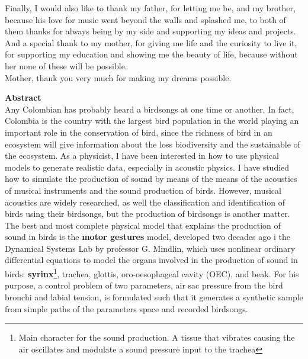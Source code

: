Finally, I would also like to thank my father, for letting me be, and my brother, because his love for music went beyond the walls and splashed me, to both of them thanks for always being by my side and supporting my ideas and projects. And a special thank to my mother, for giving me life and the curiosity to live it, for supporting my education and showing me the beauty of life, because without her none of these will be possible.\\

Mother, thank you very much for making my dreams possible.

\newpage{\pagestyle{empty}\cleardoublepage}

\newpage


\textbf{\LARGE Abstract}\\

Any Colombian has probably heard a birdsongs at one time or another. In fact, Colombia is the country with the largest bird population in the world playing an important role in the conservation of bird, since the  richness of bird in an ecosystem will give information about the loss biodiversity and the sustainable of the ecosystem. As a physicist, I have been interested in how to use physical models to generate realistic data, especially in acoustic physics. I have studied how to simulate the production of sound by means of the means of the acoustics of musical instruments and the sound production of birds. However, musical acoustics are widely researched, as well the classification and identification of birds using their birdsongs, but the production of birdsongs is another matter. The best and most complete physical model that explains the production of sound in birds is the \textbf{motor gestures}\cite{simple_motor_gestures_2001} model, developed two decades ago i the Dynamical Systems Lab by professor G. Mindlin, which uses nonlinear ordinary differential equations to model  the organs involved in the production of sound in birds: \textbf{syrinx}\footnote{Main character for the sound production. A tissue that vibrates causing the air oscillates and modulate a sound pressure input to the trachea}, trachea, glottis, oro-oesophageal cavity (OEC), and beak. For his purpose, a control problem of two parameters, air sac pressure from the bird bronchi and labial tension, is formulated such that it generates a synthetic sample from simple paths of the parameters space and recorded birdsongs.\\

